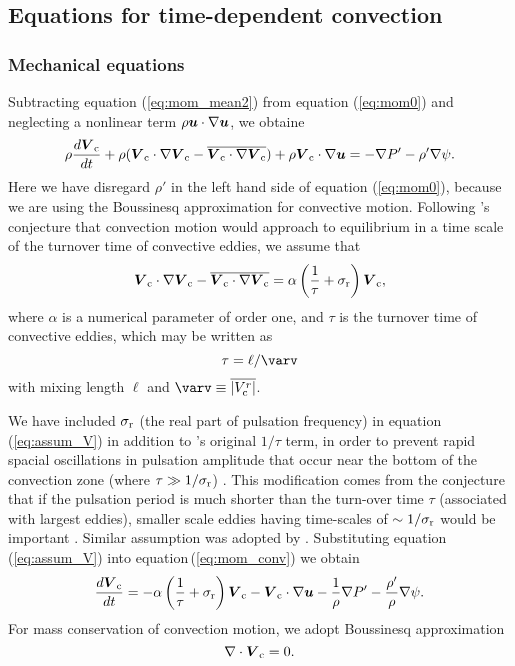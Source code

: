 \documentclass[fleqn,usenatbib]{mnras}
\def\bm#1{\mbox{\boldmath$#1$}}
\begin{document}
\subsection{Equations for time-dependent convection}
\subsubsection{Mechanical equations}
Subtracting equation (\ref{eq:mom_mean2}) from equation (\ref{eq:mom0}) and
neglecting a nonlinear term $\rho\bm{u}\cdot\nabla\bm{u}$, we obtaine
\begin{equation}
\rho{d\bm{V}_{\rm c}\over dt} + \rho(\bm{V}_{\rm c}\cdot\nabla\bm{V}_{\rm c}-
\overline{\bm{V}_{\rm c}\cdot\nabla\bm{V}_{\rm c}})
+\rho\bm{V}_{\rm c}\cdot\nabla\bm{u}= -\nabla P' - \rho'\nabla\psi.
\label{eq:mom_conv}
\end{equation}
Here we have disregard $\rho'$ in the left hand side of equation
(\ref{eq:mom0}), because we are using the Boussinesq approximation for convective motion.
Following \citet{Unno1967}'s conjecture that convection motion would approach to equilibrium in
a time scale of the turnover time of convective eddies, we assume that
\begin{equation}
\bm{V}_{\rm c}\cdot\nabla\bm{V}_{\rm c}-\overline{\bm{V}_{\rm c}\cdot\nabla\bm{V}_{\rm c}} = 
\alpha\left({1\over\tau}+\sigma_{\rm r}\right)\bm{V}_{\rm c},
\label{eq:assum_V}
\end{equation}
where $\alpha$ is a numerical parameter of order one, and
$\tau$ is the turnover time of convective eddies, which may be written as
\begin{equation}
\tau = \ell/\varv
\end{equation}
with mixing length $\ell$ and $\varv\equiv\overline{|V_{\rm c}^r|}$. 

We have included $\sigma_{\rm r}$ (the real part of pulsation frequency)
in equation (\ref{eq:assum_V}) in addition to \citet{Unno1967}'s original 
$1/\tau$ term, 
in order to prevent rapid spacial oscillations in pulsation amplitude
that occur near the bottom of the convection zone 
(where $\tau\gg1/\sigma_{\rm r}$) \citep{Gonczi1980,Liege2005}.    
This modification comes from the conjecture that 
if the pulsation period is much shorter
than the turn-over time $\tau$ (associated with largest eddies), 
smaller scale eddies having time-scales of 
$\sim1/\sigma_{\rm r}$ would be important \citep{Saio1980}.
Similar assumption was adopted by \citet{Liege2005}.
Substituting equation\,(\ref{eq:assum_V}) into equation\,(\ref{eq:mom_conv})
we obtain
\begin{equation}
{d\bm{V}_{\rm c}\over dt} = -\alpha\left({1\over\tau}
 +\sigma_{\rm r}\right)\bm{V}_{\rm c} - \bm{V}_{\rm c}\cdot\nabla\bm{u}
 -{1\over\rho}\nabla P' - {\rho'\over\rho}\nabla\psi.
\label{eq:mom_conv1}
\end{equation}
For mass conservation of convection motion, we adopt Boussinesq approximation
\begin{equation}
\nabla\cdot\bm{V}_{\rm c} = 0 .
\label{eq:div0}
\end{equation}
\end{document}

